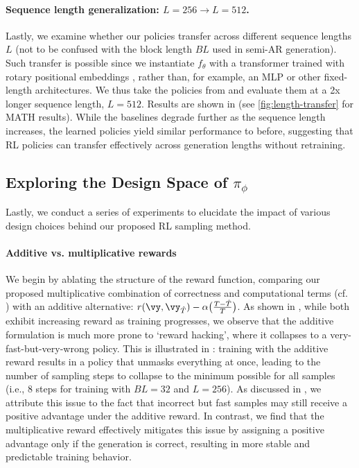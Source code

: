 \paragraph{Sequence length generalization: $L=256 \to L=512$.}
Lastly, we examine whether our policies transfer across different sequence lengths $L$ (not to be confused with the block length $BL$ used in semi-AR generation).
Such transfer is possible since we instantiate $f_\theta$ with a transformer trained with rotary positional embeddings \citep{su2021roformer}, rather than, for example, an MLP or other fixed-length architectures.
We thus take the policies from  and evaluate them at a 2x longer sequence length, $L=512$.
Results are shown in  (see \autoref{fig:length-transfer} for MATH results). While the baselines degrade further as the sequence length increases, the learned policies yield similar performance to before, suggesting that RL policies can transfer effectively across generation lengths without retraining.



\subsection{Exploring the Design Space of $\pi_\phi$}
\label{sec:exp-ablate}
Lastly, we conduct a series of experiments to elucidate the impact of various design choices behind our proposed RL sampling method.

\paragraph{Additive vs. multiplicative rewards}
We begin by ablating the structure of the reward function, comparing our proposed multiplicative combination of correctness and computational terms (cf. ) with an additive alternative: $r(\vy, \vy_{\hat{T}})- \alpha \big(\frac{T - \hat{T}}{T} \big)$.
As shown in , while both exhibit increasing reward as training progresses, we observe that the additive formulation is much more prone to `reward hacking', where it collapses to a very-fast-but-very-wrong policy.
This is illustrated in : training with the additive reward results in a policy that unmasks everything at once, leading to the number of sampling steps to collapse to the minimum possible for all samples (i.e., $8$ steps for training with $BL=32$ and $L=256$).
As discussed in , we attribute this issue to the fact that incorrect but fast samples may still receive a positive advantage under the additive reward. %
In contrast, we find that the multiplicative reward effectively mitigates this issue by assigning a positive advantage only if the generation is correct, resulting in more stable and predictable training behavior.

